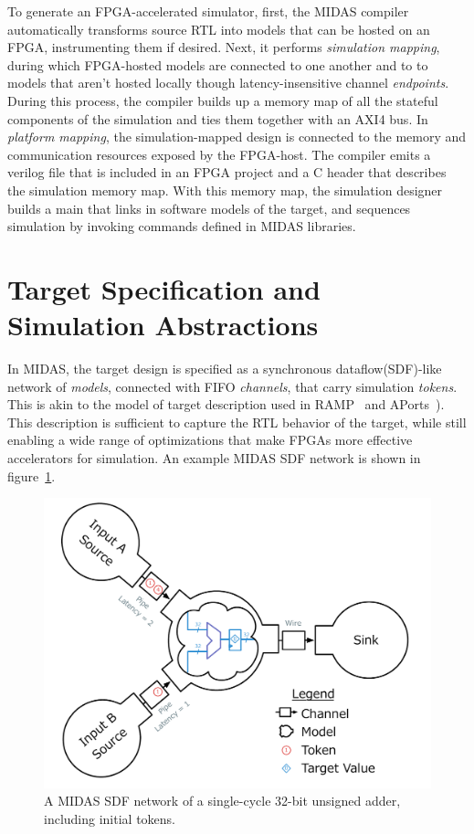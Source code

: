 To generate an FPGA-accelerated simulator, first, the MIDAS compiler
automatically transforms source RTL into models that can be hosted on an FPGA,
instrumenting them if desired. Next, it performs \emph{simulation mapping},
during which FPGA-hosted models are connected to one another and to to models
that aren't hosted locally though latency-insensitive channel \emph{endpoints}.
During this process, the compiler builds up a memory map of all the stateful
components of the simulation and ties them together with an AXI4 bus. In
\emph{platform mapping}, the simulation-mapped design is connected to the
memory and communication resources exposed by the FPGA-host. The compiler emits
a verilog file that is included in an FPGA project and a C header that
describes the simulation memory map.  With this memory map, the simulation
designer builds a main that links in software models of the target, and
sequences simulation by invoking commands defined in MIDAS libraries.

\section{Target Specification and Simulation Abstractions}\label{sec:sdf}

In MIDAS, the target design is specified as a synchronous dataflow(SDF)-like
network of \emph{models}, connected with FIFO \emph{channels}, that carry
simulation \emph{tokens}. This is akin to the model of target description used in
RAMP~\cite{ramp} and APorts~\cite{APortNetworks}). This description is sufficient
to capture the RTL behavior of the target, while still enabling a wide range of
optimizations that make FPGAs more effective accelerators for simulation. An
example MIDAS SDF network is shown in figure~\ref{fig:adder-example}.

\begin{figure}
	\centering
	\includegraphics[width=16cm]{figures/adder-example.pdf}
    \caption{A MIDAS SDF network of a single-cycle 32-bit unsigned adder, including initial tokens.}
	\label{fig:adder-example}
\end{figure}

